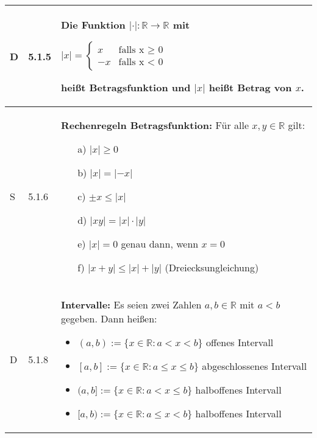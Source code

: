 \begin{longtable}{p{0.75cm} p{1cm} p{16cm}}
        \midrule
        D   & 5.1.5 &   Die Funktion $|\cdot|: \mathbb{R} \rightarrow \mathbb{R}$ mit \hfill \break
                        \centerline{    
                            $|x| =  \begin{cases}
                            x & \text{falls x $\geq$ 0} \\
                            -x & \text{falls x < 0}
                        \end{cases}$
                        } \hfill \break
                        heißt \textbf{Betragsfunktion} und $|x|$ heißt Betrag von $x$. \\
        \midrule
        S   & 5.1.6 &   \textbf{Rechenregeln Betragsfunktion:} \hfill \break
                        Für alle $x,y \in \mathbb{R}$ gilt: 
                        \begin{itemize}[topsep=-0.5cm]
                            \item[a)] $|x| \geq 0$
                            \item[b)] $|x| = |-x|$
                            \item[c)] $\pm x \leq |x|$
                            \item[d)] $|xy| = |x| \cdot |y|$
                            \item[e)] $|x| = 0$ genau dann, wenn $x = 0$
                            \item[f)] $|x+y| \leq |x| + |y|$ (Dreiecksungleichung)  
                        \end{itemize} \vspace{-0cm} \\
        \midrule
        D   & 5.1.8 &   \textbf{Intervalle:} \hfill \break 
                        Es seien zwei Zahlen $a,b \in \mathbb{R}$ mit $a < b$ gegeben. Dann heißen:
                        \begin{itemize}[topsep=-0.5cm]
                            \item $(a,b):= \{x \in \mathbb{R}: a < x < b\}$ offenes Intervall
                            \item $[a,b]:= \{x \in \mathbb{R}: a \leq x \leq b\}$ abgeschlossenes Intervall
                            \item $(a,b]:= \{x \in \mathbb{R}: a < x \leq b\}$ halboffenes Intervall
                            \item $[a,b):= \{x \in \mathbb{R}: a \leq x < b\}$ halboffenes Intervall
                        \end{itemize} \vspace{-0cm} \hfill \break

\end{longtable}
